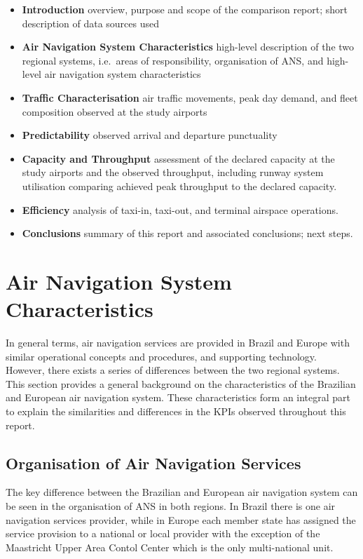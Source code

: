 \documentclass[
]{book}
\providecommand{\tightlist}{%
  \setlength{\itemsep}{0pt}\setlength{\parskip}{0pt}}
\begin{document}
\begin{itemize}
\tightlist
\item
  \textbf{Introduction} overview, purpose and scope of the comparison report; short description of data sources used
\item
  \textbf{Air Navigation System Characteristics} high-level description of the two regional systems, i.e.~areas of responsibility, organisation of ANS, and high-level air navigation system characteristics
\item
  \textbf{Traffic Characterisation} air traffic movements, peak day demand, and fleet composition observed at the study airports
\item
  \textbf{Predictability} observed arrival and departure punctuality
\item
  \textbf{Capacity and Throughput} assessment of the declared capacity at the study airports and the observed throughput, including runway system utilisation comparing achieved peak throughput to the declared capacity.
\item
  \textbf{Efficiency} analysis of taxi-in, taxi-out, and terminal airspace operations.
\item
  \textbf{Conclusions} summary of this report and associated conclusions; next steps.
\end{itemize}

\hypertarget{air-navigation-system-characteristics}{%
\chapter{Air Navigation System Characteristics}\label{air-navigation-system-characteristics}}

In general terms, air navigation services are provided in Brazil and Europe with similar operational concepts and procedures, and supporting technology.
However, there exists a series of differences between the two regional systems.
This section provides a general background on the characteristics of the Brazilian and European air navigation system. These characteristics form an integral part to explain the similarities and differences in the KPIs observed throughout this report.

\hypertarget{org-ans}{%
\section{Organisation of Air Navigation Services}\label{org-ans}}

The key difference between the Brazilian and European air navigation system can be seen in the organisation of ANS in both regions. In Brazil there is one air navigation services provider, while in Europe each member state has assigned the service provision to a national or local provider with the exception of the Maastricht Upper Area Contol Center which is the only multi-national unit.
\end{document}
